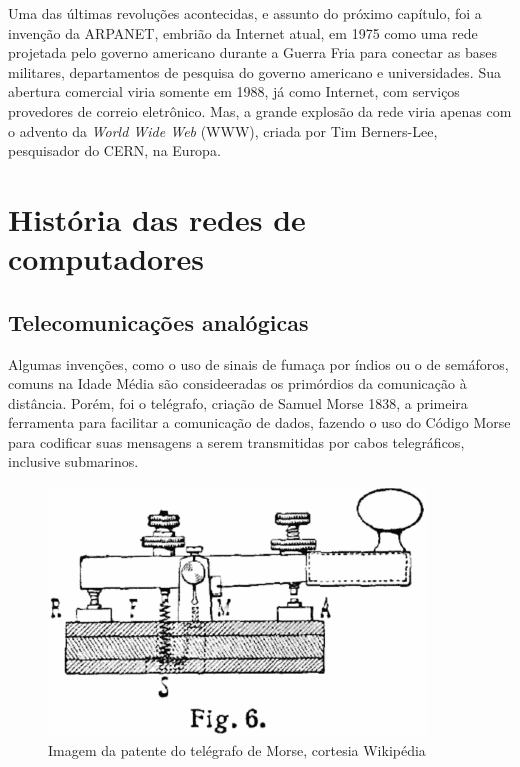 \documentclass[brazil,times]{abnt}
\begin{document}
Uma das últimas revoluções acontecidas, e assunto do próximo capítulo, foi a
invenção da ARPANET, embrião da Internet atual, em 1975 como uma rede projetada
pelo governo americano durante a Guerra Fria para conectar as bases militares,
departamentos de pesquisa do governo americano e universidades. Sua abertura
comercial viria somente em 1988, já como Internet, com serviços provedores
de correio eletrônico. Mas, a grande explosão da rede viria apenas com o advento
da \emph{World Wide Web} (WWW), criada por Tim Berners-Lee, pesquisador do CERN,
na Europa. 

\chapter{História das redes de computadores}
\section{Telecomunicações analógicas}
Algumas invenções, como o uso de sinais de fumaça por índios ou o de semáforos,
comuns na Idade Média são consideeradas os primórdios da comunicação à
distância. Porém, foi o telégrafo, criação de Samuel Morse 1838, a primeira ferramenta para
facilitar a comunicação de dados, fazendo o uso do Código Morse para codificar suas
mensagens a serem transmitidas por cabos telegráficos, inclusive submarinos.

\begin{figure}[htp]
\begin{center}
  \includegraphics[width=100mm]{imagens/L-Telegraph1.png}
  \caption[Imagem da patente do telégrafo de Morse, cortesia Wikipédia]{Imagem
  da patente do telégrafo de Morse, cortesia Wikipédia}
  \label{fig:telegrafo}
\end{center}
\end{figure}
\end{document}
